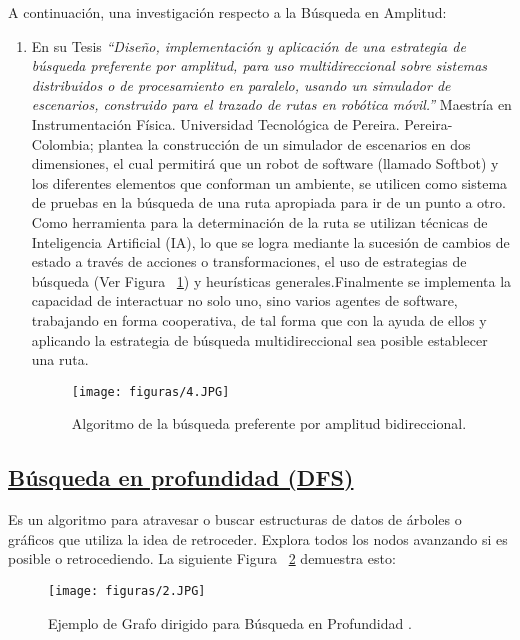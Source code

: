 \documentclass[10pt,conference]{IEEEtran}
\begin{document}
A continuación, una investigación respecto a la Búsqueda en Amplitud:
\begin{enumerate}
\item En su Tesis \textit{“Diseño, implementación y aplicación de una estrategia de búsqueda preferente por amplitud, para uso multidireccional sobre sistemas distribuidos o de procesamiento en paralelo, usando un simulador de escenarios, construido para el trazado de rutas en robótica móvil.”} Maestría en Instrumentación Física. Universidad Tecnológica de Pereira. Pereira-Colombia; \citep{gonzalez} plantea la construcción de un simulador de escenarios en dos dimensiones, el cual permitirá que un robot de software (llamado Softbot) y los diferentes elementos que conforman un ambiente, se utilicen como sistema de pruebas en la búsqueda de una ruta apropiada para ir de un punto a otro. Como herramienta para la determinación de la ruta se utilizan técnicas de Inteligencia Artificial (IA), lo que se logra mediante la sucesión de cambios de estado a través de acciones o transformaciones, el uso de estrategias de búsqueda (Ver Figura ~\ref{f4}) y heurísticas generales.Finalmente se implementa la capacidad de interactuar no solo uno, sino varios agentes de software, trabajando en forma cooperativa, de tal forma que con la ayuda de ellos y aplicando la estrategia de búsqueda multidireccional sea posible establecer una ruta.
\begin{figure}[H]
 \begin{center}
       \texttt{[image: figuras/4.JPG]}
      \caption{Algoritmo de la búsqueda preferente por amplitud bidireccional.}
      \label{f4} 
      \end{center}
\end{figure}
\end{enumerate}
\subsection{\underline{\textbf{Búsqueda en profundidad (DFS)}}}
Es un algoritmo para atravesar o buscar estructuras de datos de árboles o gráficos que utiliza la idea de retroceder. Explora todos los nodos avanzando si es posible o retrocediendo.\citep{profundidad}
La siguiente Figura ~\ref{f2} demuestra esto:

\begin{figure}[H]
 \begin{center}
       \texttt{[image: figuras/2.JPG]}
      \caption{Ejemplo de Grafo dirigido para Búsqueda en Profundidad .}
      \label{f2} 
      \end{center}
\end{figure}
\end{document}
